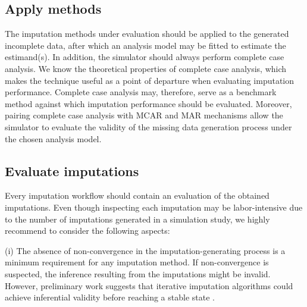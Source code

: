 \documentclass[bimj,fleqn]{w-art}
\begin{document}

\subsection{Apply methods}


The imputation methods under evaluation should be applied to the generated incomplete data, after which an analysis model may be fitted to estimate the estimand(s). In addition, the simulator should always perform complete case analysis. We know the theoretical properties of complete case analysis, which makes the technique useful as a point of departure when evaluating imputation performance. Complete case analysis may, therefore, serve as a benchmark method against which imputation performance should be evaluated. Moreover, pairing complete case analysis with MCAR and MAR mechanisms allow the simulator to evaluate the validity of the missing data generation process under the chosen analysis model.



\subsection{Evaluate imputations}


Every imputation workflow should contain an evaluation of the obtained imputations. Even though inspecting each imputation may be labor-intensive due to the number of imputations generated in a simulation study, we highly recommend to consider the following aspects:

(i) The absence of non-convergence in the imputation-generating process is a minimum requirement for any imputation method. If non-convergence is suspected, the inference resulting from the imputations might be invalid. However, preliminary work suggests that iterative imputation algorithms could achieve inferential validity before reaching a stable state \citep{ober21}. 
\end{document}
